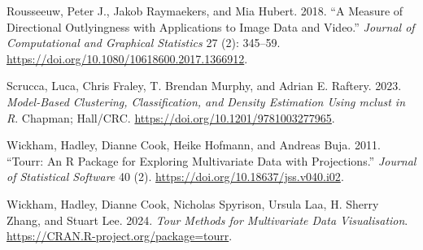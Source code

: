 \documentclass[
  12pt,
]{interact}
\newlength{\cslhangindent}
\newenvironment{CSLReferences}[2] %
 {\begin{list}{}{%
  \setlength{\itemindent}{0pt}
  \setlength{\leftmargin}{0pt}
  \setlength{\parsep}{0pt}
  \ifodd #1
   \setlength{\leftmargin}{\cslhangindent}
   \setlength{\itemindent}{-1\cslhangindent}
  \fi
  \setlength{\itemsep}{#2\baselineskip}}}
 {\end{list}}
\begin{document}
\begin{CSLReferences}{1}{0}
Rousseeuw, Peter J., Jakob Raymaekers, and Mia Hubert. 2018. {``A
Measure of Directional Outlyingness with Applications to Image Data and
Video.''} \emph{Journal of Computational and Graphical Statistics} 27
(2): 345--59. \url{https://doi.org/10.1080/10618600.2017.1366912}.

Scrucca, Luca, Chris Fraley, T. Brendan Murphy, and Adrian E. Raftery.
2023. \emph{Model-Based Clustering, Classification, and Density
Estimation Using {mclust} in {R}}. Chapman; Hall/CRC.
\url{https://doi.org/10.1201/9781003277965}.

Wickham, Hadley, Dianne Cook, Heike Hofmann, and Andreas Buja. 2011.
{``Tourr: {An} {R} {Package} for {Exploring} {Multivariate} {Data} with
{Projections}.''} \emph{Journal of Statistical Software} 40 (2).
\url{https://doi.org/10.18637/jss.v040.i02}.

Wickham, Hadley, Dianne Cook, Nicholas Spyrison, Ursula Laa, H. Sherry
Zhang, and Stuart Lee. 2024. \emph{Tour Methods for Multivariate Data
Visualisation}. \url{https://CRAN.R-project.org/package=tourr}.

\end{CSLReferences}
\end{document}
